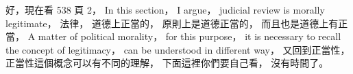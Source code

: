 \hypertarget{w02:cue:2427}{}好，現在看 538 頁 2，
\hypertarget{w02:cue:2428}{}In this section，
\hypertarget{w02:cue:2429}{}I argue，
\hypertarget{w02:cue:2430}{}judicial review is morally legitimate，
\hypertarget{w02:cue:2431}{}法律，
\hypertarget{w02:cue:2432}{}道德上正當的，
\hypertarget{w02:cue:2433}{}原則上是道德正當的，
\hypertarget{w02:cue:2434}{}而且也是道德上有正當，
\hypertarget{w02:cue:2435}{}A matter of political morality，
\hypertarget{w02:cue:2436}{}for this purpose，
\hypertarget{w02:cue:2437}{}it is necessary to recall the concept of legitimacy，
\hypertarget{w02:cue:2438}{}can be understood in different way，
\hypertarget{w02:cue:2439}{}又回到正當性，
\hypertarget{w02:cue:2440}{}正當性這個概念可以有不同的理解，
\hypertarget{w02:cue:2441}{}下面這裡你們要自己看，
\hypertarget{w02:cue:2442}{}沒有時間了。

